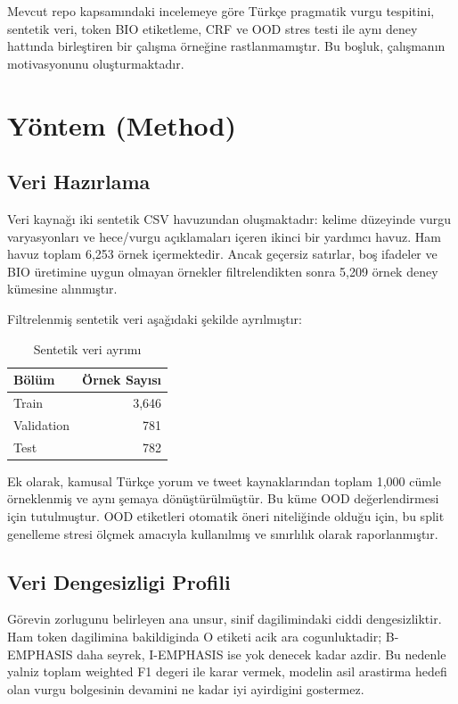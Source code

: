 \documentclass[conference]{IEEEtran}
\begin{document}
Mevcut repo kapsamındaki incelemeye göre Türkçe pragmatik vurgu tespitini, sentetik veri, token BIO etiketleme, CRF ve OOD stres testi ile aynı deney hattında birleştiren bir çalışma örneğine rastlanmamıştır. Bu boşluk, çalışmanın motivasyonunu oluşturmaktadır.

\section{Yöntem (Method)}
\subsection{Veri Hazırlama}
Veri kaynağı iki sentetik CSV havuzundan oluşmaktadır: kelime düzeyinde vurgu varyasyonları ve hece/vurgu açıklamaları içeren ikinci bir yardımcı havuz. Ham havuz toplam 6{,}253 örnek içermektedir. Ancak geçersiz satırlar, boş ifadeler ve BIO üretimine uygun olmayan örnekler filtrelendikten sonra 5{,}209 örnek deney kümesine alınmıştır.

Filtrelenmiş sentetik veri aşağıdaki şekilde ayrılmıştır:

\begin{table}[H]
\centering
\caption{Sentetik veri ayrımı}
\begin{tabular}{lr}
\toprule
Bölüm & Örnek Sayısı \\
\midrule
Train & 3{,}646 \\
Validation & 781 \\
Test & 782 \\
\bottomrule
\end{tabular}
\end{table}

Ek olarak, kamusal Türkçe yorum ve tweet kaynaklarından toplam 1{,}000 cümle örneklenmiş ve aynı şemaya dönüştürülmüştür. Bu küme OOD değerlendirmesi için tutulmuştur. OOD etiketleri otomatik öneri niteliğinde olduğu için, bu split genelleme stresi ölçmek amacıyla kullanılmış ve sınırlılık olarak raporlanmıştır.

\subsection{Veri Dengesizligi Profili}
Görevin zorlugunu belirleyen ana unsur, sinif dagilimindaki ciddi dengesizliktir. Ham token dagilimina bakildiginda O etiketi acik ara cogunluktadir; B-EMPHASIS daha seyrek, I-EMPHASIS ise yok denecek kadar azdir. Bu nedenle yalniz toplam weighted F1 degeri ile karar vermek, modelin asil arastirma hedefi olan vurgu bolgesinin devamini ne kadar iyi ayirdigini gostermez.
\end{document}
